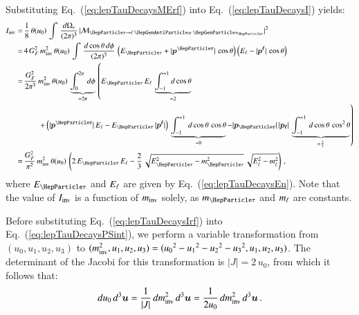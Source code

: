 Substituting Eq.~(\ref{eq:lepTauDecaysMErf}) into Eq.~(\ref{eq:lepTauDecaysI}) yields:
\begin{align}
I_{\inv} 
= & \, \frac{1}{8} \, \theta ( u_{0} ) \, \int \, \frac{d\Omega_{v}}{(2\pi)^{3}} \, \vert\mathcal{M}_{\Pgt \to
  \ellnunu}\vert^{2} \nonumber \\
= & \, 4 \, G^{2}_{F} \, m^{2}_{\inv} \, \theta ( u_{0} ) \, \int \, \frac{d\cos\theta \, d\phi}{(2\pi)^{3}} \, 
  \left( E_{\Pgt} + \vert\bm{p^{\Pgt}}\vert \, \cos\theta \right)  \left( E_{\Plepton} - \vert\bm{p^{\Plepton}}\vert \, \cos\theta \right) \nonumber \\
= & \, \frac{G^{2}_{F}}{2 \pi^{3}} \, m^{2}_{\inv} \, \theta ( u_{0} ) \, \underbrace{\int_{0}^{2 \pi} \, d\phi}_{= 2 \pi} \, 
  \left( E_{\Pgt} \, E_{\Plepton} \, \underbrace{\int_{-1}^{+1}
      d\cos\theta}_{= 2} \right. \nonumber \\
& \qquad
     \left. + \left( \vert\bm{p^{\Pgt}}\vert \, E_{\Plepton} - E_{\Pgt} \,
       \vert\bm{p^{\Plepton}}\vert \right) \,
     \underbrace{\int_{-1}^{+1} \, d\cos\theta \, \cos\theta}_{= 0} 
  - \vert\bm{p_{\Pgt}}\vert \, \vert\bm{p_{\Plepton}}\vert
       \, \underbrace{\int_{-1}^{+1} \, d\cos\theta \, \cos^{2}\theta}_{= \frac{2}{3}} \right) \nonumber \\
= & \, \frac{G^{2}_{F}}{\pi^{2}} \, m^{2}_{\inv} \, \theta ( u_{0} ) \, 
  \left( 2 \, E_{\Pgt} \, E_{\Plepton} - \frac{2}{3} \, \sqrt{E^{2}_{\Pgt} - m^{2}_{\Pgt}} \, \sqrt{E^{2}_{\Plepton} - m^{2}_{\Plepton}} \right) \, ,
\label{eq:lepTauDecaysIrf}
\end{align}
where $E_{\Pgt}$ and $E_{\ell}$ are given by Eq.~(\ref{eq:lepTauDecaysEn}).
Note that the value of $I
_{\textrm{inv}}$ is a function of $m_{\textrm{inv}}$ solely,
as $m_{\Pgt}$ and $m_{\ell}$ are constants.

Before substituting Eq.~(\ref{eq:lepTauDecaysIrf}) into Eq.~(\ref{eq:lepTauDecaysPSint}),
we perform a variable transformation from $( u_{0}, u_{1}, u_{2}, u_{3} )$ to $( m^{2}_{\textrm{inv}}, u_{1}, u_{2}, u_{3} ) = ( {u_{0}}^{2} - {u_{1}}^{2} - {u_{2}}^{2} - {u_{3}}^{2}, u_{1}, u_{2}, u_{3} )$.
The determinant of the Jacobi for this transformation is $\vert J
\vert = 2 \, u_{0}$,
from which it follows that:
\begin{equation}
du_{0} \, d^{3}\bm{u} = \frac{1}{\vert J \vert} \, dm^{2}_{\textrm{inv}} \,
d^{3}\bm{u} = \frac{1}{2 u_{0}} \, dm^{2}_{\textrm{inv}} \, d^{3}\bm{u} \, .
\label{eq:lepTauDecaysJacobi}
\end{equation}

